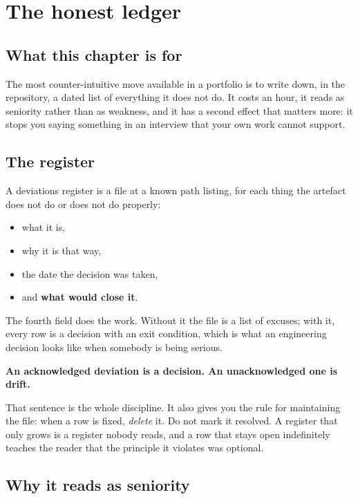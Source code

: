\chapter{The honest ledger}
\label{ch:ledger}

\section*{What this chapter is for}

The most counter-intuitive move available in a portfolio is to write down, in
the repository, a dated list of everything it does not do. It costs an hour, it
reads as seniority rather than as weakness, and it has a second effect that
matters more: it stops you saying something in an interview that your own work
cannot support.

\section{The register}

A deviations register is a file at a known path listing, for each thing the
artefact does not do or does not do properly:

\begin{itemize}
  \item what it is,
  \item why it is that way,
  \item the date the decision was taken,
  \item and \textbf{what would close it}.
\end{itemize}

The fourth field does the work. Without it the file is a list of excuses; with
it, every row is a decision with an exit condition, which is what an engineering
decision looks like when somebody is being serious.

\begin{kitnote}
\textbf{An acknowledged deviation is a decision. An unacknowledged one is
drift.}

That sentence is the whole discipline. It also gives you the rule for
maintaining the file: when a row is fixed, \emph{delete} it. Do not mark it
resolved. A register that only grows is a register nobody reads, and a row that
stays open indefinitely teaches the reader that the principle it violates was
optional.
\end{kitnote}

\section{Why it reads as seniority}

